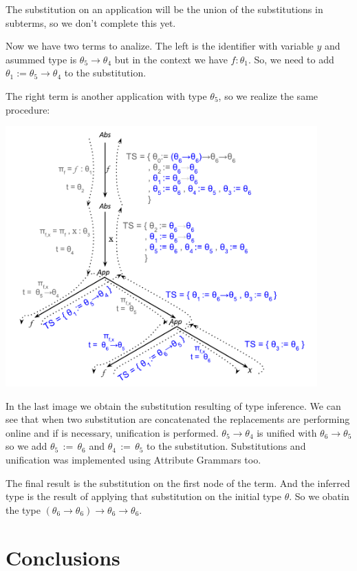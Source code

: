 \documentclass[a4paper,10pt]{article}
\begin{document}
  The substitution on an application will be the union of the substitutions in subterms, so we don't complete this
  yet.
  \medskip

  Now we have two terms to analize. The left is the identifier with variable $y$ and asummed type is $\theta_5 \rightarrow \theta_4$
  but in the context we have $f:\theta_1$. So, we need to add $\theta_1 := \theta_5 \rightarrow \theta_4$ to the substitution.
  
  The right term is another application with type $\theta_5$, so we realize the same procedure:
  
  \begin{center}
	\includegraphics[height=10cm]{cuarto.pdf}
  \end{center}
   
  In the last image we obtain the substitution resulting of type inference. We can see that when 
  two substitution are concatenated the replacements are performing online and if is necessary,
  unification is performed. $\theta_5 \rightarrow \theta_4$ is unified with $\theta_6 \rightarrow \theta_5$
  so we add $\theta_5\,:=\,\theta_6$ and $\theta_4\,:=\,\theta_5$ to the substitution.
  Substitutions and unification was implemented using Attribute Grammars too.
  
  The final result is the substitution on the first node of the term. And the inferred type
  is the result of applying that substitution on the initial type $\theta$. So we obatin the type
  $(\theta_6 \rightarrow \theta_6) \rightarrow \theta_6 \rightarrow \theta_6$.
 
  
  \section{Conclusions}
  
\end{document}

